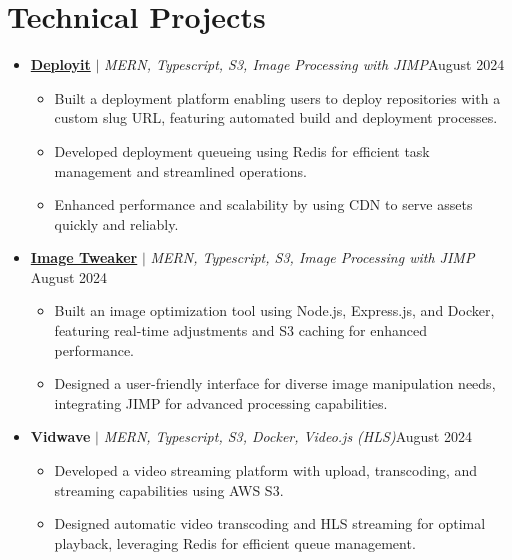 \documentclass[letterpaper,11pt]{article}
\begin{document}
\section{Technical Projects}
\vspace{-1pt}
\begin{itemize}[leftmargin=*,itemsep=2pt,parsep=0pt,topsep=0pt,partopsep=0pt]

    \item \textbf{\href{https://deployit.live/}{Deployit}} $|$ \emph{MERN, Typescript, S3, Image Processing with JIMP}\hfill {August 2024}
          \begin{itemize}[leftmargin=*,itemsep=1pt,parsep=0pt,topsep=0pt,partopsep=0pt]
              \item Built a deployment platform enabling users to deploy repositories with a custom
                    slug URL, featuring automated build and deployment processes.
              \item Developed deployment queueing using Redis for efficient task management and
                    streamlined operations.
              \item Enhanced performance and scalability by using CDN to serve assets quickly and
                    reliably.
          \end{itemize}

    \item \textbf{\href{https://image-tweaker.pulkitxm.com/}{Image Tweaker}} $|$ \emph{MERN, Typescript, S3, Image Processing with JIMP} \hfill { August 2024}
          \begin{itemize}[leftmargin=*,itemsep=1pt,parsep=0pt,topsep=0pt,partopsep=0pt]
              \item Built an image optimization tool using Node.js, Express.js, and Docker,
                    featuring real-time adjustments and S3 caching for enhanced performance.
              \item Designed a user-friendly interface for diverse image manipulation needs,
                    integrating JIMP for advanced processing capabilities.
          \end{itemize}

    \item \textbf{Vidwave} $|$ \emph{MERN, Typescript, S3, Docker, Video.js (HLS)}\hfill {August 2024}
          \begin{itemize}[leftmargin=*,itemsep=1pt,parsep=0pt,topsep=0pt,partopsep=0pt]
              \item Developed a video streaming platform with upload, transcoding, and streaming
                    capabilities using AWS S3.
              \item Designed automatic video transcoding and HLS streaming for optimal playback,
                    leveraging Redis for efficient queue management.
          \end{itemize}

\end{itemize}
\vspace{-8pt}
\end{document}
